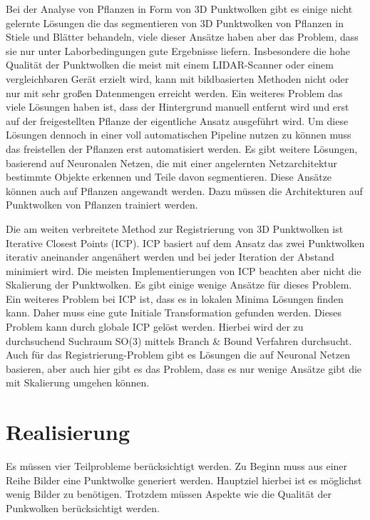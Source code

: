 \documentclass[12pt,titlepage, twoside]{article}
\begin{document}
Bei der Analyse von Pflanzen in Form von 3D Punktwolken gibt es einige nicht gelernte Lösungen \cite{ThreeBasics} \cite{RegionGrowing} die das segmentieren von 3D Punktwolken von Pflanzen in Stiele und Blätter behandeln, viele dieser Ansätze haben aber das Problem, dass sie nur unter Laborbedingungen gute Ergebnisse liefern. 
Insbesondere die hohe Qualität der Punktwolken die meist mit einem LIDAR-Scanner oder einem vergleichbaren Gerät erzielt wird, kann mit bildbasierten Methoden nicht oder nur mit sehr großen Datenmengen erreicht werden. 
Ein weiteres Problem das viele Lösungen haben ist, dass der Hintergrund manuell entfernt wird und erst auf der freigestellten Pflanze der eigentliche Ansatz ausgeführt wird. 
Um diese Lösungen dennoch in einer voll automatischen Pipeline nutzen zu können muss das freistellen der Pflanzen erst automatisiert werden.
Es gibt weitere Lösungen, basierend auf Neuronalen Netzen, die mit einer angelernten Netzarchitektur bestimmte Objekte erkennen und Teile davon segmentieren. Diese Ansätze können auch auf Pflanzen angewandt werden. Dazu müssen die Architekturen auf Punktwolken von Pflanzen trainiert werden.  

Die am weiten verbreitete Method zur Registrierung von 3D Punktwolken ist Iterative Closest Points (ICP). ICP basiert auf dem Ansatz das zwei Punktwolken iterativ aneinander angenähert werden und bei jeder Iteration der Abstand minimiert wird.
Die meisten Implementierungen von ICP beachten aber nicht die Skalierung der Punktwolken. Es gibt einige wenige Ansätze für dieses Problem. 
Ein weiteres Problem bei ICP ist, dass es in lokalen Minima Lösungen finden kann. Daher muss eine gute Initiale Transformation gefunden werden. Dieses Problem kann durch globale ICP gelöst werden. Hierbei wird der zu durchsuchend Suchraum SO(3) mittels Branch \& Bound Verfahren durchsucht.
Auch für das Registrierung-Problem gibt es Lösungen die auf Neuronal Netzen basieren, aber auch hier gibt es das Problem, dass es nur wenige Ansätze gibt die mit Skalierung umgehen können.

\newpage
\section{Realisierung}
\label{sec:realisierung}
Es müssen vier Teilprobleme berücksichtigt werden. Zu Beginn muss aus einer Reihe Bilder eine Punktwolke generiert werden. Hauptziel hierbei ist es möglichst wenig Bilder zu benötigen. 
Trotzdem müssen Aspekte wie die Qualität der Punkwolken berücksichtigt werden. 
\end{document}
